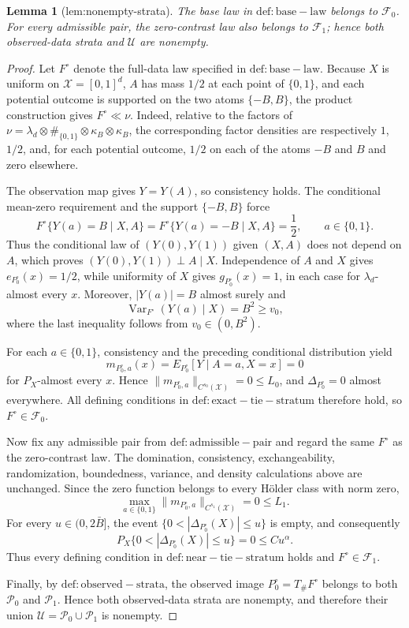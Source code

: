 \documentclass{article}
\newtheorem{lemma}{Lemma}
\begin{document}
\begin{lemma}[lem:nonempty-strata]\label{lem:nonempty-strata}
The base law in \(\mathrm{def:base-law}\) belongs to \(\mathcal F_0\).  For every admissible pair, the zero-contrast law also belongs to \(\mathcal F_1\); hence both observed-data strata and \(\mathcal U\) are nonempty.
\end{lemma}
\begin{proof}
Let \(F^\circ\) denote the full-data law specified in \(\mathrm{def:base-law}\). Because \(X\) is uniform on \(\mathcal X=[0,1]^d\), \(A\) has mass \(1/2\) at each point of \(\{0,1\}\), and each potential outcome is supported on the two atoms \(\{-B,B\}\), the product construction gives \(F^\circ\ll\nu\). Indeed, relative to the factors of \(\nu=\lambda_d\otimes\#_{\{0,1\}}\otimes\kappa_B\otimes\kappa_B\), the corresponding factor densities are respectively \(1\), \(1/2\), and, for each potential outcome, \(1/2\) on each of the atoms \(-B\) and \(B\) and zero elsewhere.

The observation map gives \(Y=Y(A)\), so consistency holds. The conditional mean-zero requirement and the support \(\{-B,B\}\) force
\[
F^\circ\{Y(a)=B\mid X,A\}=F^\circ\{Y(a)=-B\mid X,A\}=\frac12,
\qquad a\in\{0,1\}.
\]
Thus the conditional law of \((Y(0),Y(1))\) given \((X,A)\) does not depend on \(A\), which proves \((Y(0),Y(1))\perp A\mid X\). Independence of \(A\) and \(X\) gives \(e_{P_0^\circ}(x)=1/2\), while uniformity of \(X\) gives \(g_{P_0^\circ}(x)=1\), in each case for \(\lambda_d\)-almost every \(x\). Moreover, \(|Y(a)|=B\) almost surely and
\[
\operatorname{Var}_{F^\circ}(Y(a)\mid X)=B^2\ge v_0,
\]
where the last inequality follows from \(v_0\in(0,B^2)\).

For each \(a\in\{0,1\}\), consistency and the preceding conditional distribution yield
\[
m_{P_0^\circ,a}(x)=E_{P_0^\circ}[Y\mid A=a,X=x]=0
\]
for \(P_X\)-almost every \(x\). Hence \(\lVert m_{P_0^\circ,a}\rVert_{C^{s_0}(\mathcal X)}=0\le L_0\), and \(\Delta_{P_0^\circ}=0\) almost everywhere. All defining conditions in \(\mathrm{def:exact-tie-stratum}\) therefore hold, so \(F^\circ\in\mathcal F_0\).

Now fix any admissible pair from \(\mathrm{def:admissible-pair}\) and regard the same \(F^\circ\) as the zero-contrast law. The domination, consistency, exchangeability, randomization, boundedness, variance, and density calculations above are unchanged. Since the zero function belongs to every Hölder class with norm zero,
\[
\max_{a\in\{0,1\}}\lVert m_{P_0^\circ,a}\rVert_{C^{s_1}(\mathcal X)}=0\le L_1.
\]
For every \(u\in(0,2\bar B]\), the event \(\{0<|\Delta_{P_0^\circ}(X)|\le u\}\) is empty, and consequently
\[
P_X\{0<|\Delta_{P_0^\circ}(X)|\le u\}=0\le Cu^\alpha.
\]
Thus every defining condition in \(\mathrm{def:near-tie-stratum}\) holds and \(F^\circ\in\mathcal F_1\).

Finally, by \(\mathrm{def:observed-strata}\), the observed image \(P_0^\circ=T_\#F^\circ\) belongs to both \(\mathcal P_0\) and \(\mathcal P_1\). Hence both observed-data strata are nonempty, and therefore their union \(\mathcal U=\mathcal P_0\cup\mathcal P_1\) is nonempty.
\end{proof}
\end{document}
